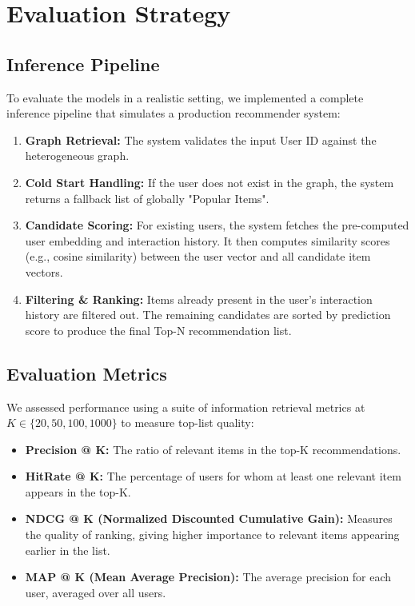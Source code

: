 \documentclass{article}
\begin{document}
\section{Evaluation Strategy}

\subsection{Inference Pipeline}
To evaluate the models in a realistic setting, we implemented a complete inference pipeline that simulates a production recommender system:
\begin{enumerate}
    \item \textbf{Graph Retrieval:} The system validates the input User ID against the heterogeneous graph.
    \item \textbf{Cold Start Handling:} If the user does not exist in the graph, the system returns a fallback list of globally "Popular Items".
    \item \textbf{Candidate Scoring:} For existing users, the system fetches the pre-computed user embedding and interaction history. It then computes similarity scores (e.g., cosine similarity) between the user vector and all candidate item vectors.
    \item \textbf{Filtering \& Ranking:} Items already present in the user's interaction history are filtered out. The remaining candidates are sorted by prediction score to produce the final Top-N recommendation list.
\end{enumerate}

\subsection{Evaluation Metrics}
We assessed performance using a suite of information retrieval metrics at $K \in \{20, 50, 100, 1000\}$ to measure top-list quality:
\begin{itemize}
    \item \textbf{Precision @ K:} The ratio of relevant items in the top-K recommendations.
    \item \textbf{HitRate @ K:} The percentage of users for whom at least one relevant item appears in the top-K.
    \item \textbf{NDCG @ K (Normalized Discounted Cumulative Gain):} Measures the quality of ranking, giving higher importance to relevant items appearing earlier in the list.
    \item \textbf{MAP @ K (Mean Average Precision):} The average precision for each user, averaged over all users.
\end{itemize}
\end{document}
